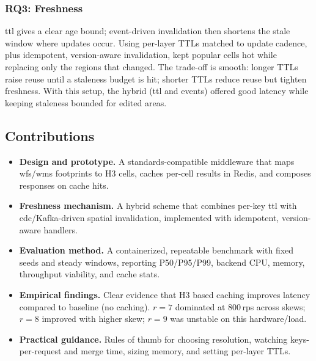 \subsubsection{RQ3: Freshness}
\ac{ttl} gives a clear age bound; event-driven invalidation then shortens the stale window where updates occur. Using per-layer TTLs matched to update cadence, plus idempotent, version-aware invalidation, kept popular cells hot while replacing only the regions that changed. The trade-off is smooth: longer TTLs raise reuse until a staleness budget is hit; shorter TTLs reduce reuse but tighten freshness. With this setup, the hybrid (\ac{ttl} and events) offered good latency while keeping staleness bounded for edited areas.

\subsection{Contributions}
\begin{itemize}
  \item \textbf{Design and prototype.} A standards-compatible middleware that maps \ac{wfs}/\ac{wms} footprints to H3 cells, caches per-cell results in Redis, and composes responses on cache hits.
  \item \textbf{Freshness mechanism.} A hybrid scheme that combines per-key \ac{ttl} with \ac{cdc}/Kafka-driven spatial invalidation, implemented with idempotent, version-aware handlers.
  \item \textbf{Evaluation method.} A containerized, repeatable benchmark with fixed seeds and steady windows, reporting P50/P95/P99, backend CPU, memory, throughput viability, and cache stats.
  \item \textbf{Empirical findings.} Clear evidence that H3 based caching improves latency compared to baseline (no caching). $r{=}7$ dominated at 800\,\ac{rps} across skews; $r{=}8$ improved with higher skew; $r{=}9$ was unstable on this hardware/load.
  \item \textbf{Practical guidance.} Rules of thumb for choosing resolution, watching keys-per-request and merge time, sizing memory, and setting per-layer TTLs.
\end{itemize}

